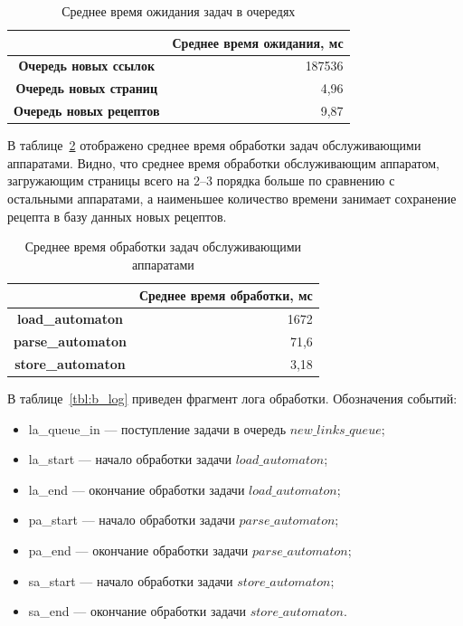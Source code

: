 \begin{table}[!ht]
	\centering
	\caption{Среднее время ожидания задач в очередях}
	\label{tab:queue-wait}
	\begin{tabular}{|c|r|}
		\hline
		\textbf{}                       & \multicolumn{1}{c|}{\textbf{Среднее время ожидания, мс}} \\ \hline
		\textbf{Очередь новых ссылок}   & 187536                                                   \\ \hline
		\textbf{Очередь новых страниц}  & 4,96                                                     \\ \hline
		\textbf{Очередь новых рецептов} & 9,87                                                     \\ \hline
	\end{tabular}
\end{table}

В таблице~\ref{tab:automaton-processing} отображено среднее время обработки задач обслуживающими аппаратами. Видно, что среднее время обработки обслуживающим аппаратом, загружающим страницы всего на 2--3 порядка больше по сравнению с остальными аппаратами, а наименьшее количество времени занимает сохранение рецепта в базу данных новых рецептов.

\begin{table}[!ht]
	\centering
	\caption{Среднее время обработки задач обслуживающими аппаратами}
	\label{tab:automaton-processing}
	\begin{tabular}{|c|r|}
		\hline
		\textbf{}                & \multicolumn{1}{c|}{\textbf{Среднее время обработки, мс}} \\ \hline
		\textbf{load\_automaton}  & 1672                                                      \\ \hline
		\textbf{parse\_automaton} & 71,6                                                      \\ \hline
		\textbf{store\_automaton} & 3,18                                                      \\ \hline
	\end{tabular}
\end{table}

В таблице~\ref{tbl:b_log} приведен фрагмент лога обработки. Обозначения событий:
\begin{itemize}
    \item la\_queue\_in --- поступление задачи в очередь $new\_links\_queue$;
    \item la\_start --- начало обработки задачи $load\_automaton$;
    \item la\_end — окончание обработки задачи $load\_automaton$;
    \item pa\_start --- начало обработки задачи $parse\_automaton$;
    \item pa\_end — окончание обработки задачи $parse\_automaton$;
    \item sa\_start --- начало обработки задачи $store\_automaton$;
    \item sa\_end — окончание обработки задачи $store\_automaton$.
\end{itemize}

